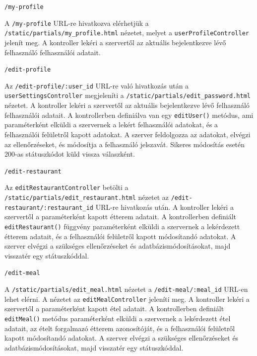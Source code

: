 \bigskip

\noindent \texttt{/my-profile}

A \texttt{/my-profile} URL-re hivatkozva elérhetjük a \texttt{/static/partials/my\_profile.html} nézetet, melyet a \texttt{userProfileController} jelenít meg. A kontroller lekéri a szervertől az aktuális bejelentkezve lévő felhasználó felhasználói adatait.

\bigskip

\noindent \texttt{/edit-profile}

Az \texttt{/edit-profile/:user\_id} URL-re való hivatkozás után a \texttt{userSettingsController} megjeleníti a \texttt{/static/partials/edit\_password.html} nézetet. A kontroller lekéri a szervertől az aktuális bejelentkezve lévő felhasználó felhasználói adatait. A kontrollerben definiálva van egy \texttt{editUser()} metódus, ami paraméterként elküldi a szervernek a lekért felhasználói adatokat, és a felhasználói felületről kapott adatokat. A szerver feldolgozza az adatokat, elvégzi az ellenőrzéseket, és módosítja a felhasználó jelszavát. Sikeres módosítás esetén 200-as státuszkódot küld vissza válaszként.

\bigskip

\noindent \texttt{/edit-restaurant}

Az \texttt{editRestaurantController} betölti a \texttt{/static/partials/edit\_restaurant.html} nézetet az \texttt{/edit-restaurant/:restaurant\_id} URL-re hivatkozás után. A kontroller lekéri a szervertől a paraméterként kapott étterem adatait. A kontrollerben definiált \texttt{editRestaurant()} függvény paraméterként elküldi a szervernek a lekérdezett étterem adatait, és a felhasználói felületről kapott módosítandó adatokat. A szerver elvégzi a szükséges ellenőrzéseket és adatbázismódosításokat, majd visszatér egy státuszkóddal.

\bigskip

\noindent \texttt{/edit-meal}

A \texttt{/static/partials/edit\_meal.html} nézetet a \texttt{/edit-meal/:meal\_id} URL-en lehet elérni. A nézetet az \texttt{editMealController} jeleníti meg. A kontroller lekéri a szervertől a paraméterként kapott étel adatait. A kontrollerben definiált \texttt{editMeal()} metódus paraméterként elküldi a szervernek a lekérdezett étel adatait, az ételt forgalmazó étterem azonosítóját, és a felhasználói felületről kapott módosítandó adatokat. A szerver elvégzi a szükséges ellenőrzéseket és adatbázismódosításokat, majd visszatér egy státuszkóddal.
